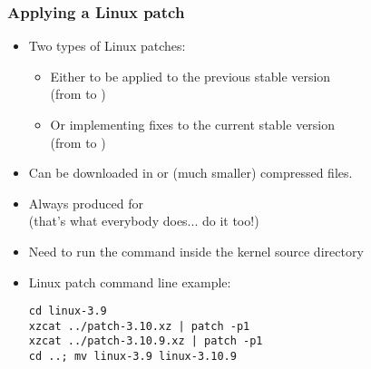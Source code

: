 \begin{frame}[fragile]
  \frametitle{Applying a Linux patch}
  \begin{itemize}
  \item Two types of Linux patches:
        \begin{itemize}
	\item Either to be applied to the previous stable version\\
	      (from  to )
	\item Or implementing fixes to the current stable version\\
	      (from  to )
	\end{itemize}
  \item Can be downloaded in  or  (much
    smaller) compressed files.
  \item Always produced for \\
    (that's what everybody does... do it too!)
  \item Need to run the  command inside the kernel source
    directory
  \item Linux patch command line example:\\
\begin{verbatim}
cd linux-3.9
xzcat ../patch-3.10.xz | patch -p1
xzcat ../patch-3.10.9.xz | patch -p1
cd ..; mv linux-3.9 linux-3.10.9
\end{verbatim}
  \end{itemize}
\end{frame}

